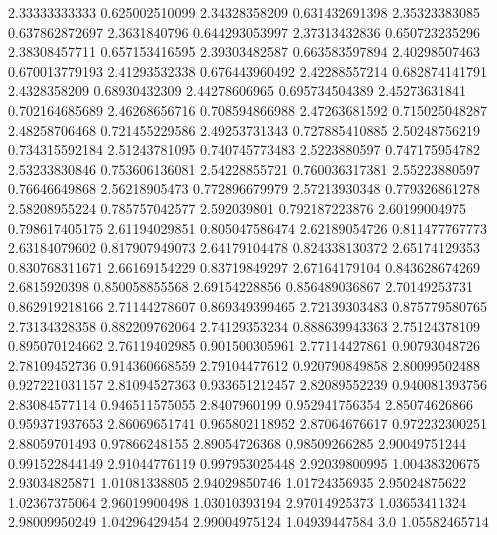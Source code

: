   2.33333333333   0.625002510099
  2.34328358209   0.631432691398
  2.35323383085   0.637862872697
   2.3631840796   0.644293053997
  2.37313432836   0.650723235296
  2.38308457711   0.657153416595
  2.39303482587   0.663583597894
  2.40298507463   0.670013779193
  2.41293532338   0.676443960492
  2.42288557214   0.682874141791
   2.4328358209    0.68930432309
  2.44278606965   0.695734504389
  2.45273631841   0.702164685689
  2.46268656716   0.708594866988
  2.47263681592   0.715025048287
  2.48258706468   0.721455229586
  2.49253731343   0.727885410885
  2.50248756219   0.734315592184
  2.51243781095   0.740745773483
   2.5223880597   0.747175954782
  2.53233830846   0.753606136081
  2.54228855721   0.760036317381
  2.55223880597    0.76646649868
  2.56218905473   0.772896679979
  2.57213930348   0.779326861278
  2.58208955224   0.785757042577
    2.592039801   0.792187223876
  2.60199004975   0.798617405175
  2.61194029851   0.805047586474
  2.62189054726   0.811477767773
  2.63184079602   0.817907949073
  2.64179104478   0.824338130372
  2.65174129353   0.830768311671
  2.66169154229    0.83719849297
  2.67164179104   0.843628674269
   2.6815920398   0.850058855568
  2.69154228856   0.856489036867
  2.70149253731   0.862919218166
  2.71144278607   0.869349399465
  2.72139303483   0.875779580765
  2.73134328358   0.882209762064
  2.74129353234   0.888639943363
  2.75124378109   0.895070124662
  2.76119402985   0.901500305961
  2.77114427861    0.90793048726
  2.78109452736   0.914360668559
  2.79104477612   0.920790849858
  2.80099502488   0.927221031157
  2.81094527363   0.933651212457
  2.82089552239   0.940081393756
  2.83084577114   0.946511575055
   2.8407960199   0.952941756354
  2.85074626866   0.959371937653
  2.86069651741   0.965802118952
  2.87064676617   0.972232300251
  2.88059701493    0.97866248155
  2.89054726368    0.98509266285
  2.90049751244   0.991522844149
  2.91044776119   0.997953025448
  2.92039800995    1.00438320675
  2.93034825871    1.01081338805
  2.94029850746    1.01724356935
  2.95024875622    1.02367375064
  2.96019900498    1.03010393194
  2.97014925373    1.03653411324
  2.98009950249    1.04296429454
  2.99004975124    1.04939447584
            3.0    1.05582465714

